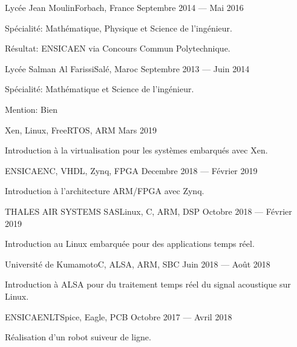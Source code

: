 \documentclass{faresume}
\begin{document}
\begin{column}[\leftcolumnwidth]
			{Lyc\'ee Jean Moulin}{Forbach, France}
			{Septembre 2014 --- Mai 2016}
			{
				\begin{additems}
					\item Sp\'ecialit\'e: Math\'ematique, Physique et Science de l'ing\'enieur.
					\item R\'esultat: ENSICAEN via Concours Commun Polytechnique.
				\end{additems}
			}

			{Lyc\'ee Salman Al Farissi}{Sal\'e, Maroc}
			{Septembre 2013 --- Juin 2014}
			{
				\begin{additems}
					\item Sp\'ecialit\'e: Math\'ematique et Science de l'ing\'enieur.
					\item Mention: Bien
				\end{additems}
			}


			{}{Xen, Linux, FreeRTOS, ARM}
			{Mars 2019}
			{
				\begin{additems}
					\item Introduction \`a la virtualisation pour les syst\`emes embarqu\'es avec Xen.
				\end{additems}
			}

			{ENSICAEN}{C, VHDL, Zynq, FPGA}
			{Decembre 2018 --- F\'evrier 2019}
			{
				\begin{additems}
					\item Introduction \`a l'architecture ARM/FPGA avec Zynq.
				\end{additems}
			}

			{THALES AIR SYSTEMS SAS}{Linux, C, ARM, DSP}
			{Octobre 2018 --- F\'evrier 2019}
			{
				\begin{additems}
					\item Introduction au Linux embarqu\'ee pour des applications temps r\'eel.
				\end{additems}
			}

			{Universit\'e de Kumamoto}{C, ALSA, ARM, SBC}
			{Juin 2018 --- Ao\^ut 2018}
			{
				\begin{additems}
					\item Introduction \`a ALSA pour du traitement temps r\'eel du signal acoustique sur Linux.
				\end{additems}
			}

			{ENSICAEN}{LTSpice, Eagle, PCB}
			{Octobre 2017 --- Avril 2018}
			{
				\begin{additems}
					\item R\'ealisation d'un robot suiveur de ligne.
				\end{additems}
			}

\end{column}
\end{document}
